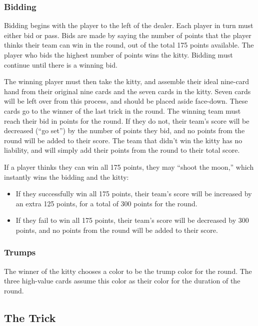 \documentclass[10pt]{article}
\begin{document}
\subsubsection{Bidding}

Bidding begins with the player to the left of the dealer.
Each player in turn must either bid or pass.
Bids are made by saying the number of points that the player thinks their team can win in the round, out of the total 175 points available.
The player who bids the highest number of points wins the kitty.
Bidding must continue until there is a winning bid.

The winning player must then take the kitty, and assemble their ideal nine-card hand from their original nine cards and the seven cards in the kitty.
Seven cards will be left over from this process, and should be placed aside face-down. These cards go to the winner of the last trick in the round.
The winning team must reach their bid in points for the round. If they do not, their team's score will be decreased (``go set'') by the number of points they bid, and no points from the round will be added to their score.
The team that didn't win the kitty has no liability, and will simply add their points from the round to their total score.

If a player thinks they can win all 175 points, they may ``shoot the moon,'' which instantly wins the bidding and the kitty:
\begin{itemize}
    \item If they successfully win all 175 points, their team's score will be increased by an extra 125 points, for a total of 300 points for the round.
    \item If they fail to win all 175 points, their team's score will be decreased by 300 points, and no points from the round will be added to their score.
\end{itemize}

\subsubsection{Trumps}

The winner of the kitty chooses a color to be the trump color for the round.
The three high-value cards assume this color as their color for the duration of the round.

\subsection{The Trick}
\end{document}
